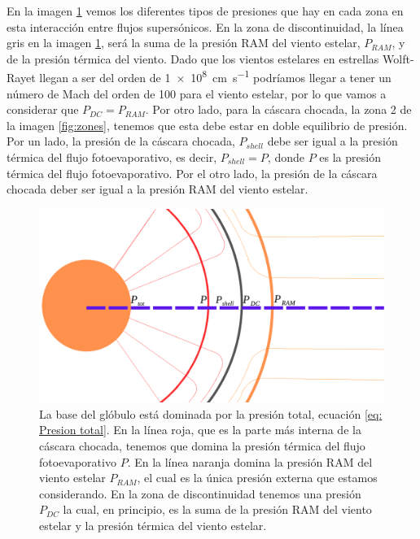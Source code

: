 \documentclass{book}
\begin{document}
En la imagen \ref{fig:zones_presiones} vemos los diferentes tipos de presiones que hay en cada zona en esta interacción entre flujos supersónicos. En la zona de discontinuidad, la línea gris en la imagen \ref{fig:zones_presiones}, será la suma de la presión RAM del viento estelar, $P_{RAM}$, y de la presión térmica del viento. Dado que los vientos estelares en estrellas Wolft-Rayet llegan a ser del orden de \SI{1e8}{cm.s^{-1}} podríamos llegar a tener un número de Mach del orden de 100 para el viento estelar, por lo que vamos a considerar que $P_{DC}=P_{RAM}$. Por otro lado, para la cáscara chocada, la zona 2 de la imagen \ref{fig:zones}, tenemos que esta debe estar en doble equilibrio de presión. Por un lado, la presión de la cáscara chocada, $P_{shell}$ debe ser igual a la presión térmica del flujo fotoevaporativo, es decir, $P_{shell}=P$, donde $P$ es la presión térmica del flujo fotoevaporativo. Por el otro lado, la presión de la cáscara chocada deber ser igual a la presión RAM del viento estelar.

\begin{figure}[htb]
    \centering    \includegraphics[width=\textwidth]{Nuevas imagenes finales/zones_presiones_01.pdf}
    \caption{La base del glóbulo está dominada por la presión total, ecuación \ref{eq: Presion total}. En la línea roja, que es la parte más interna de la cáscara chocada, tenemos que domina la presión térmica del flujo fotoevaporativo $P$. En la línea naranja domina la presión RAM del viento estelar $P_{RAM}$, el cual es la única presión externa que estamos considerando. En la zona de discontinuidad tenemos una presión $P_{DC}$ la cual, en principio, es la suma de la presión RAM del viento estelar y la presión térmica del viento estelar. }
    \label{fig:zones_presiones}
\end{figure}
\end{document}
